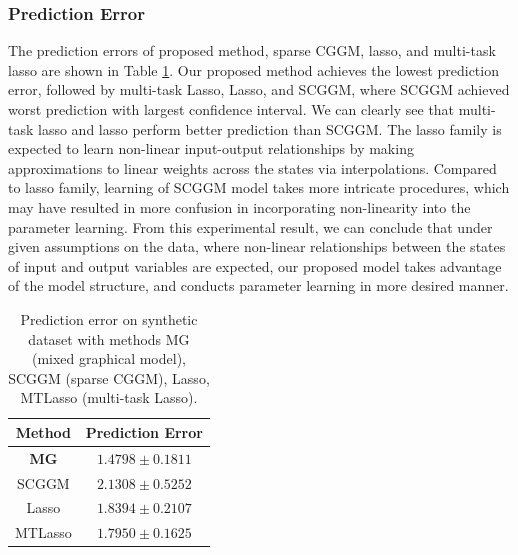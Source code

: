 \documentclass{article}
\begin{document}
 
 
 
 

\subsubsection{Prediction Error}

The prediction errors of proposed method, sparse CGGM, lasso, and multi-task lasso are shown in Table \ref{table:syn_pred_err}.
Our proposed method achieves the lowest prediction error, followed by multi-task Lasso, Lasso, and SCGGM, where SCGGM achieved worst prediction with largest confidence interval.
We can clearly see that multi-task lasso and lasso perform better prediction than SCGGM.
The lasso family is expected to learn non-linear input-output relationships by making approximations to linear weights across the states via interpolations.
Compared to lasso family, learning of SCGGM model takes more intricate procedures, which may have resulted in more confusion in incorporating non-linearity into the parameter learning.
From this experimental result, we can conclude that under given assumptions on the data, where non-linear relationships between the states of input and output variables are expected, our proposed model takes advantage of the model structure, and conducts parameter learning in more desired manner.



 
\begin{table}[hbtp]
\begin{center}
    \begin{tabular}{| c | c |}
    \hline
    Method & Prediction Error \\
    \hline
    \textbf{MG} & $\mathbf{1.4798 \pm 0.1811}$ \\
    SCGGM & $2.1308 \pm 0.5252$  \\
    Lasso & $1.8394 \pm 0.2107$  \\
    MTLasso & $1.7950 \pm 0.1625$ \\
    \hline 
    \end{tabular}
\end{center}
 	\caption{Prediction error on synthetic dataset with methods MG (mixed graphical model), SCGGM (sparse CGGM), Lasso, MTLasso (multi-task Lasso).}
 \label{table:syn_pred_err}
\end{table}
\end{document}
